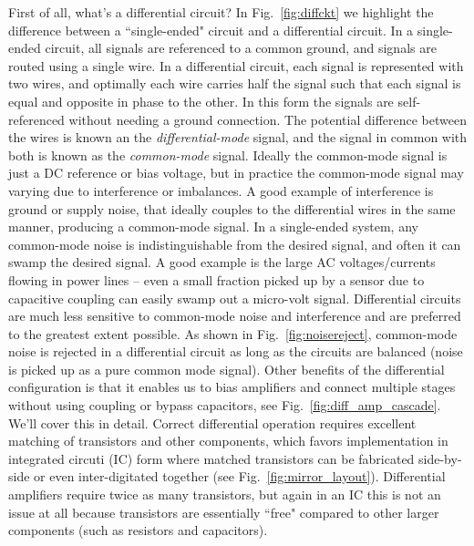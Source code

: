 First of all, what's a differential circuit?  In Fig.~\ref{fig:diffckt} we highlight the difference between a ``single-ended" circuit and a differential circuit. In a single-ended circuit, all signals are referenced to a common ground, and signals are routed using a single wire.  In a differential circuit, each signal is represented with two wires, and optimally each wire carries half the signal such that each signal is equal and opposite in phase to the other.  In this form the signals are self-referenced without needing a ground connection.   The potential difference between the wires is known an the \emph{differential-mode} signal, and the signal in common with both is known as the \emph{common-mode} signal.  Ideally the common-mode signal is just a DC reference or bias voltage, but in practice the common-mode signal may varying due to interference or imbalances.  A good example of interference is ground or supply noise, that ideally couples to the differential wires in the same manner, producing a common-mode signal.  In a single-ended system, any common-mode noise is indistinguishable from the desired signal, and often it can swamp the desired signal.  A good example is the large AC voltages/currents flowing in power lines -- even a small fraction picked up by a sensor due to capacitive coupling can easily swamp out a micro-volt signal.  
Differential circuits are much less sensitive to common-mode noise and interference and are preferred to the greatest extent possible.  As shown in Fig.~\ref{fig:noisereject}, common-mode noise is rejected in a differential circuit as long as the circuits are balanced (noise is picked up as a pure common mode signal).  Other benefits of the differential configuration is that it enables us to bias amplifiers and connect multiple stages without using coupling or bypass capacitors, see Fig.~\ref{fig:diff_amp_cascade}.  We'll cover this in detail.  
Correct differential operation requires excellent matching of transistors and other components, which favors implementation in integrated circuti (IC) form where matched transistors can be fabricated side-by-side or even inter-digitated together (see Fig.~\ref{fig:mirror_layout}).  Differential amplifiers require twice as many transistors, but again in an IC this is not an issue at all because transistors are essentially ``free" compared to other larger components (such as resistors and capacitors).
